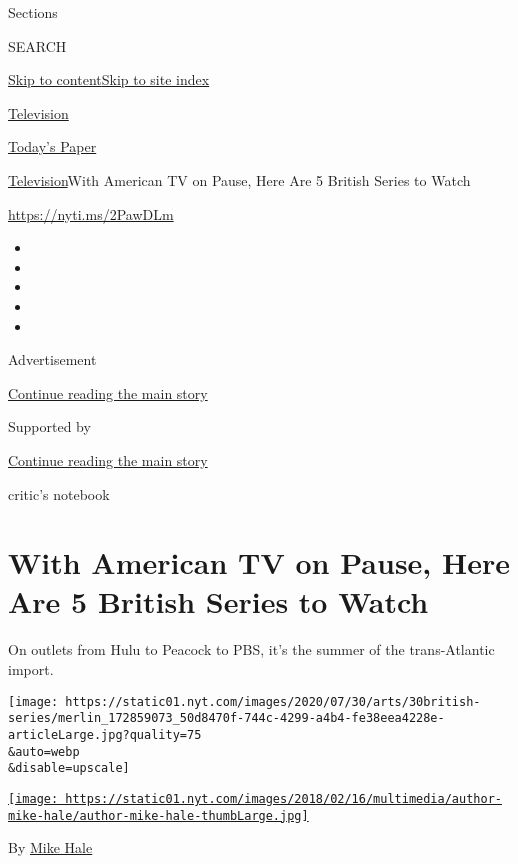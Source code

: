 Sections

SEARCH

\protect\hyperlink{site-content}{Skip to
content}\protect\hyperlink{site-index}{Skip to site index}

\href{https://www.nytimes.com/section/arts/television}{Television}

\href{https://myaccount.nytimes.com/auth/login?response_type=cookie\&client_id=vi}{}

\href{https://www.nytimes.com/section/todayspaper}{Today's Paper}

\href{/section/arts/television}{Television}\textbar{}With American TV on
Pause, Here Are 5 British Series to Watch

\url{https://nyti.ms/2PawDLm}

\begin{itemize}
\item
\item
\item
\item
\item
\end{itemize}

Advertisement

\protect\hyperlink{after-top}{Continue reading the main story}

Supported by

\protect\hyperlink{after-sponsor}{Continue reading the main story}

critic's notebook

\hypertarget{with-american-tv-on-pause-here-are-5-british-series-to-watch}{%
\section{With American TV on Pause, Here Are 5 British Series to
Watch}\label{with-american-tv-on-pause-here-are-5-british-series-to-watch}}

On outlets from Hulu to Peacock to PBS, it's the summer of the
trans-Atlantic import.

\texttt{[image: https://static01.nyt.com/images/2020/07/30/arts/30british-series/merlin\_172859073\_50d8470f-744c-4299-a4b4-fe38eea4228e-articleLarge.jpg?quality=75\\\&auto=webp\\\&disable=upscale]}

\href{https://www.nytimes.com/by/mike-hale}{\texttt{[image: https://static01.nyt.com/images/2018/02/16/multimedia/author-mike-hale/author-mike-hale-thumbLarge.jpg]}}

By \href{https://www.nytimes.com/by/mike-hale}{Mike Hale}


